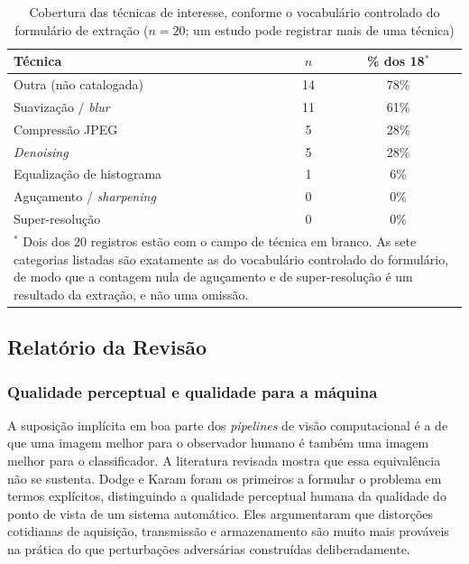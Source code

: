 \documentclass[conference]{IEEEtran}
\begin{document}
\begin{table}[htbp]
\caption{Cobertura das técnicas de interesse, conforme o vocabulário controlado do formulário de extração ($n=20$; um estudo pode registrar mais de uma técnica)}
\begin{center}
\footnotesize
\begin{tabular}{|p{3.4cm}|c|c|}
\hline
\textbf{Técnica} & \textbf{$n$} & \textbf{\% dos 18$^{\ast}$} \\
\hline
Outra (não catalogada) & 14 & 78\% \\
\hline
Suavização / \textit{blur} & 11 & 61\% \\
\hline
Compressão JPEG & 5 & 28\% \\
\hline
\textit{Denoising} & 5 & 28\% \\
\hline
Equalização de histograma & 1 & 6\% \\
\hline
Aguçamento / \textit{sharpening} & 0 & 0\% \\
\hline
Super-resolução & 0 & 0\% \\
\hline
\multicolumn{3}{|p{6.9cm}|}{\footnotesize $^{\ast}$ Dois dos 20 registros estão
com o campo de técnica em branco. As sete categorias listadas são exatamente as
do vocabulário controlado do formulário, de modo que a contagem nula de
aguçamento e de super-resolução é um resultado da extração, e não uma omissão.} \\
\hline
\end{tabular}
\label{tab:cobertura}
\end{center}
\end{table}

\subsection{Relatório da Revisão}
\label{sec:rr}

\subsubsection{Qualidade perceptual e qualidade para a máquina}

A suposição implícita em boa parte dos \textit{pipelines} de visão
computacional é a de que uma imagem melhor para o observador humano é também
uma imagem melhor para o classificador. A literatura revisada mostra que essa
equivalência não se sustenta. Dodge e Karam \cite{b1} foram os primeiros a
formular o problema em termos explícitos, distinguindo a qualidade perceptual
humana da qualidade do ponto de vista de um sistema automático. Eles argumentaram
que distorções cotidianas de aquisição, transmissão e armazenamento são muito
mais prováveis na prática do que perturbações adversárias construídas deliberadamente. 
\end{document}
